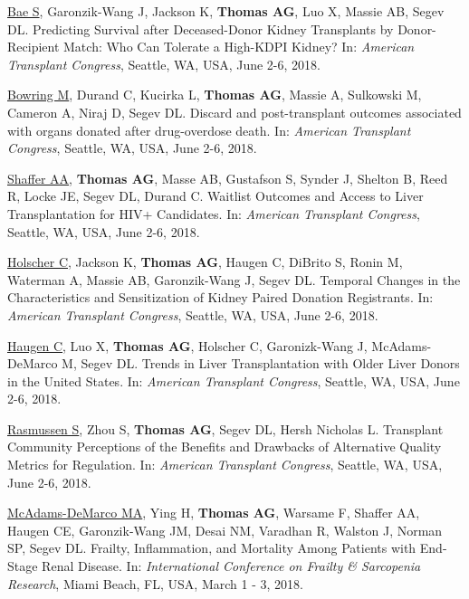 \documentclass[10pt]{article}
\makeatletter
\newlength{\bibhang}
\newlength{\bibsep}
 {\@listi \global\bibsep\itemsep \global\advance\bibsep by\parsep}
\newenvironment{bibenum*}
  {\renewcommand\labelenumi{[\theenumi]}%
   \etaremune[
     topsep=0pt,
     itemsep=\bibsep,
     parsep=0pt,partopsep=0pt,
     itemindent=-\bibhang,
     leftmargin={\bibhang+\widthof{[999]}}]}
  {\endetaremune}
\makeatother
\begin{document}
\begin{bibenum*}
\item \underline{Bae S}, Garonzik-Wang J, Jackson K, \textbf{Thomas AG},
  Luo X, Massie AB, Segev DL.
  Predicting Survival after Deceased-Donor Kidney Transplants by
  Donor-Recipient Match: Who Can Tolerate a High-KDPI Kidney?
  In: \emph{American Transplant Congress},
  Seattle, WA, USA, June 2-6, 2018.

\item \underline{Bowring M}, Durand C, Kucirka L, \textbf{Thomas AG},
  Massie A, Sulkowski M, Cameron A, Niraj D, Segev DL.
  Discard and post-transplant outcomes associated with organs
  donated after drug-overdose death.
  In: \emph{American Transplant Congress},
  Seattle, WA, USA, June 2-6, 2018.

\item \underline{Shaffer AA}, \textbf{Thomas AG}, Masse AB, Gustafson S,
  Synder J, Shelton B, Reed R, Locke JE, Segev DL, Durand C.
  Waitlist Outcomes and Access to Liver Transplantation for HIV+ Candidates.
  In: \emph{American Transplant Congress},
  Seattle, WA, USA, June 2-6, 2018.

\item \underline{Holscher C}, Jackson K, \textbf{Thomas AG}, Haugen C,
  DiBrito S, Ronin M, Waterman A, Massie AB, Garonzik-Wang J, Segev DL.
  Temporal Changes in the Characteristics and
  Sensitization of Kidney Paired Donation Registrants.
  In: \emph{American Transplant Congress},
  Seattle, WA, USA, June 2-6, 2018.

\item \underline{Haugen C}, Luo X, \textbf{Thomas AG}, Holscher C,
  Garonizk-Wang J, McAdams-DeMarco M, Segev DL.
  Trends in Liver Transplantation with Older Liver
  Donors in the United States.
  In: \emph{American Transplant Congress},
  Seattle, WA, USA, June 2-6, 2018.

\item \underline{Rasmussen S}, Zhou S, \textbf{Thomas AG},
  Segev DL, Hersh Nicholas L. Transplant Community Perceptions
  of the Benefits and Drawbacks of Alternative Quality Metrics
  for Regulation.
  In: \emph{American Transplant Congress},
  Seattle, WA, USA, June 2-6, 2018.

\item \underline{McAdams-DeMarco MA}, Ying H, \textbf{Thomas AG},
  Warsame F, Shaffer AA, Haugen CE, Garonzik-Wang JM, Desai NM,
  Varadhan R, Walston J, Norman SP, Segev DL.
  Frailty, Inflammation, and Mortality Among
  Patients with End-Stage Renal Disease.
  In: \emph{International Conference on Frailty \& Sarcopenia Research},
  Miami Beach, FL, USA, March 1 - 3, 2018.


\end{bibenum*}
\end{document}

